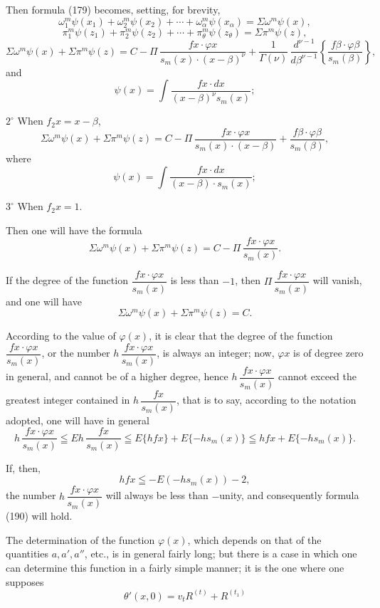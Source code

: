 \documentclass{article}
\begin{document}
Then formula (179) becomes, setting, for brevity,
\[ \omega_1^{m}\psi(x_1)+\omega_2^{m}\psi(x_2)+\cdots+\omega_\alpha^{m}\psi(x_\alpha) = \Sigma\omega^{m}\psi(x), \]
\[ \pi_1^{m}\psi(z_1)+\pi_2^{m}\psi(z_2)+\cdots+\pi_\theta^{m}\psi(z_\theta) = \Sigma\pi^{m}\psi(z), \]
\[ \Sigma\omega^{m}\psi(x)+\Sigma\pi^{m}\psi(z) = C-\Pi\,\frac{f x \cdot \varphi x}{s_m(x) \cdot (x-\beta)^{\nu}} + \frac{1}{\Gamma(\nu)}\,\frac{d^{\nu-1}}{d\beta^{\nu-1}} \left\{ \frac{f\beta \cdot \varphi\beta}{s_m(\beta)} \right\}, \]
and
\[ \psi(x) = \int \frac{f x \cdot dx}{(x-\beta)^{\nu} s_m(x)}; \]

$2^\circ$ When $f_2 x = x-\beta$,
\[ \Sigma\omega^{m}\psi(x)+\Sigma\pi^{m}\psi(z) = C-\Pi\,\frac{f x \cdot \varphi x}{s_m(x) \cdot (x-\beta)} + \frac{f\beta \cdot \varphi\beta}{s_m(\beta)}, \tag{188} \]
where
\[ \psi(x) = \int \frac{f x \cdot dx}{(x-\beta) \cdot s_m(x)}; \]

$3^\circ$ When $f_2 x = 1$.

Then one will have the formula
\[ \Sigma\omega^{m}\psi(x)+\Sigma\pi^{m}\psi(z) = C-\Pi\,\frac{f x \cdot \varphi x}{s_m(x)}. \tag{189} \]

If the degree of the function $\dfrac{f x \cdot \varphi x}{s_m(x)}$ is less than $-1$, then $\Pi\,\dfrac{f x \cdot \varphi x}{s_m(x)}$ will vanish, and one will have
\[ \Sigma\omega^{m}\psi(x)+\Sigma\pi^{m}\psi(z) = C. \tag{190} \]

According to the value of $\varphi(x)$, it is clear that the degree of the function $\dfrac{f x \cdot \varphi x}{s_m(x)}$, or the number $h\,\dfrac{f x \cdot \varphi x}{s_m(x)}$, is always an integer; now, $\varphi x$ is of degree zero in general, and cannot be of a
higher degree, hence $h\,\dfrac{f x \cdot \varphi x}{s_m(x)}$ cannot exceed the greatest integer contained in $h\,\dfrac{f x}{s_m(x)}$, that is to say, according to the notation adopted, one will have in general
\[ h\,\frac{f x \cdot \varphi x}{s_m(x)} \leqq Eh\,\frac{f x}{s_m(x)} \leqq E\{hfx\}+E\{-hs_m(x)\} \leqq hfx+E\{-hs_m(x)\}. \]

If, then,
\[ hfx \leqq -E(-hs_m(x))-2, \tag{191} \]
the number $h\,\dfrac{f x \cdot \varphi x}{s_m(x)}$ will always be less than $-$unity, and consequently formula (190) will hold.

The determination of the function $\varphi(x)$, which depends on that of the quantities $a, a', a''$, etc., is in general fairly long; but there is a case in which one can determine this function in a fairly simple manner; it is the one where one supposes
\[ \theta'(x,0) = v_t R^{(t)} + R^{(t_1)} \tag{192} \]
\end{document}
